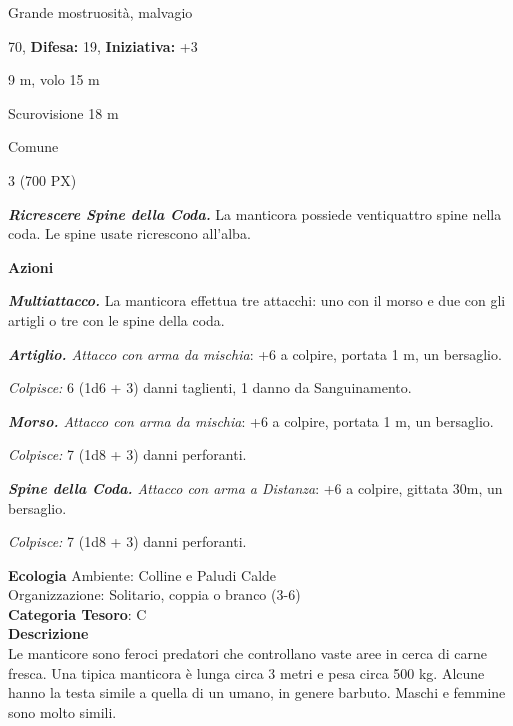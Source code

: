 \begin{multicols}{2}
{
\noindent
\begin{description}[noitemsep, topsep=0pt, parsep=0pt, partopsep=0pt, leftmargin=0cm, labelwidth=2.2cm]
	\item[\textbf{Taglia/Tipo:}] Grande mostruosità, malvagio
	\item[\textbf{Caratt.:}] 
	\item[\textbf{Punti Ferita:}] 70,  \textbf{Difesa:} 19,  \textbf{Iniziativa:} +3
	\item[\textbf{Movimento:}] 9 m, volo 15 m
	\item[\textbf{Tiri Salvez.:}] 
	\item[\textbf{Sensi:}] Scurovisione 18 m
	\item[\textbf{Linguaggi:}] Comune
	\item[\textbf{Sfida:}] 3 (700 PX)\smallskip
\end{description}

\emph{\textbf{Ricrescere Spine della Coda.}} La manticora possiede ventiquattro spine nella coda. Le spine usate ricrescono all'alba.

\textbf{Azioni}

\emph{\textbf{Multiattacco.}} La manticora effettua tre attacchi: uno con il morso e due con gli artigli o tre con le spine della coda.

\emph{\textbf{Artiglio.} Attacco con arma da mischia}: +6 a colpire, portata 1 m, un bersaglio.

\emph{Colpisce:} 6 (1d6 + 3) danni taglienti, 1 danno da Sanguinamento.

\emph{\textbf{Morso.} Attacco con arma da mischia}: +6 a colpire, portata 1 m, un bersaglio.

\emph{Colpisce:} 7 (1d8 + 3) danni perforanti.

\emph{\textbf{Spine della Coda.} Attacco con arma a Distanza}: +6 a colpire, gittata 30m, un bersaglio.

\emph{Colpisce:} 7 (1d8 + 3) danni perforanti.

\textbf{Ecologia}
Ambiente: Colline e Paludi Calde\\
Organizzazione: Solitario, coppia o branco (3-6)\\
\textbf{Categoria Tesoro}: C\\
\textbf{Descrizione}\\
Le manticore sono feroci predatori che controllano vaste aree in cerca di carne fresca. Una tipica manticora è lunga circa 3 metri e pesa circa 500 kg. Alcune hanno la testa simile a quella di un umano, in genere barbuto. Maschi e femmine sono molto simili.

}
\end{multicols}
